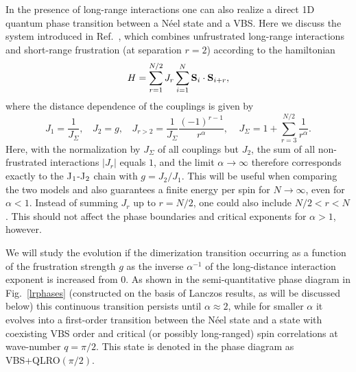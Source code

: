 \documentclass[draft,numberedheadings]{aipproc}
\begin{document}
In the presence of long-range interactions one can also realize a direct 1D quantum phase transition between a N\'eel state and a VBS. Here we 
discuss the system introduced in Ref.~\cite{awslr}, which combines unfrustrated long-range interactions and short-range frustration (at separation 
$r=2$) according to the hamiltonian
\begin{equation}
H = \sum_{r=1}^{N/2} J_r \sum_{i=1}^N {\bf S}_i \cdot {\bf S}_{i+r},
\label{ham}
\end{equation}
where the distance dependence of the couplings is given by
\begin{equation}
J_1=\frac{1}{J_{\Sigma}},~~~~J_2=g,~~~~J_{r> 2} = \frac{1}{J_{\Sigma}}\frac{(-1)^{r-1}}{r^{\alpha}},~~~~~ J_{\Sigma}= 1+ \sum_{r=3}^{N/2}\frac{1}{r^\alpha}.
\label{lrfham}
\end{equation}
Here, with the normalization by $J_{\Sigma}$ of all couplings but $J_2$, the sum of all non-frustrated interactions $|J_r|$ equals $1$, and the limit 
$\alpha \to \infty$ therefore corresponds exactly to the J$_{\rm 1}$-J$_{\rm 2}$ chain with $g=J_2/J_1$. This will be useful when comparing the two 
models and also guarantees a finite energy per spin for $N\to \infty$, even for $\alpha<1$. Instead of summing $J_r$ up to $r=N/2$, one could also 
include $N/2 < r < N$. This should not affect the phase boundaries and critical exponents for $\alpha>1$, however. 

We will study the evolution if the dimerization transition occurring as a function of the frustration strength $g$ as the inverse $\alpha^{-1}$ 
of the long-distance interaction exponent is increased from $0$. As shown in the semi-quantitative phase diagram in Fig.~\ref{lrphases} (constructed 
on the basis of Lanczos results, as will be discussed below) this continuous transition persists until $\alpha \approx 2$, while for smaller $\alpha$ 
it evolves into a first-order transition between the N\'eel state and a state with coexisting VBS order and critical (or possibly long-ranged)
spin correlations at wave-number $q=\pi/2$. This state is denoted in the phase diagram as VBS+QLRO$(\pi/2)$. 
\end{document}
